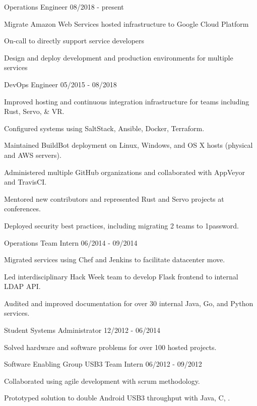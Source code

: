 \documentclass[11pt]{article} %
\begin{document}
\begin{description}
\squish
{}
           {Operations Engineer}
           {08/2018 - present}

Migrate Amazon Web Services hosted infrastructure to Google Cloud Platform

On-call to directly support service developers

Design and deploy development and production environments for multiple services

           {DevOps Engineer}
           {05/2015 - 08/2018}

Improved hosting and continuous integration infrastructure for teams
including Rust, Servo, \& VR.

Configured systems using SaltStack, Ansible, Docker, Terraform.

Maintained BuildBot deployment on Linux, Windows, and OS X hosts (physical and
AWS servers).

Administered multiple GitHub organizations and collaborated with AppVeyor and
TravisCI.

Mentored new contributors and represented Rust and Servo projects at
conferences.

Deployed security best practices, including migrating 2 teams to 1password.

           {Operations Team Intern}
           {06/2014 - 09/2014}

Migrated services using Chef and Jenkins to facilitate datacenter move.

Led interdisciplinary Hack Week team to develop Flask frontend to internal
LDAP API.

Audited and improved documentation for over 30 internal Java, Go, and Python
services.

           {Student Systems Administrator}
           {12/2012 - 06/2014}

Solved hardware and software problems for over 100 hosted projects.

           {Software Enabling Group USB3 Team Intern}
           {06/2012 - 09/2012}

Collaborated using agile development with scrum methodology.

Prototyped solution to double Android USB3 throughput with Java, C, \CPP.

\end{description}
\end{document}
